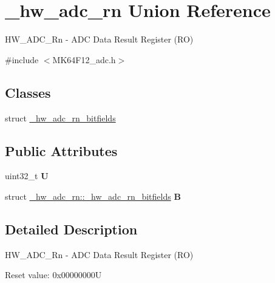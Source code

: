 \hypertarget{union__hw__adc__rn}{}\section{\+\_\+hw\+\_\+adc\+\_\+rn Union Reference}
\label{union__hw__adc__rn}


H\+W\+\_\+\+A\+D\+C\+\_\+\+Rn -\/ A\+DC Data Result Register (RO)  




{\ttfamily \#include $<$M\+K64\+F12\+\_\+adc.\+h$>$}

\subsection*{Classes}
\begin{DoxyCompactItemize}
\item 
struct \hyperlink{struct__hw__adc__rn_1_1__hw__adc__rn__bitfields}{\+\_\+hw\+\_\+adc\+\_\+rn\+\_\+bitfields}
\end{DoxyCompactItemize}
\subsection*{Public Attributes}
\begin{DoxyCompactItemize}
\item 
uint32\+\_\+t {\bfseries U}\hypertarget{union__hw__adc__rn_addf3924e98a5177b42ab7bc784d4e616}{}\label{union__hw__adc__rn_addf3924e98a5177b42ab7bc784d4e616}

\item 
struct \hyperlink{struct__hw__adc__rn_1_1__hw__adc__rn__bitfields}{\+\_\+hw\+\_\+adc\+\_\+rn\+::\+\_\+hw\+\_\+adc\+\_\+rn\+\_\+bitfields} {\bfseries B}\hypertarget{union__hw__adc__rn_a4dddda6be0978f469f673489f2143b22}{}\label{union__hw__adc__rn_a4dddda6be0978f469f673489f2143b22}

\end{DoxyCompactItemize}


\subsection{Detailed Description}
H\+W\+\_\+\+A\+D\+C\+\_\+\+Rn -\/ A\+DC Data Result Register (RO) 

Reset value\+: 0x00000000U

